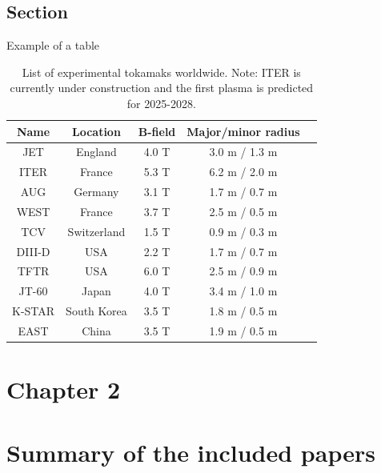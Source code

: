 \documentclass[electronic]{kthesis}
\begin{document}
	\section{Section}
	Example of a table
	\begin{table}[t!]
		\centering
		\caption{List of experimental tokamaks worldwide. Note: ITER is currently under construction and the first plasma is predicted for 2025-2028.}
		\begin{tabular}{ccccc}
			\hline
			\textbf{Name} & \textbf{Location} & \textbf{B-field} & \textbf{Major/minor radius}  \\
			\hline
			JET     & England      & 4.0 T & 3.0 m / 1.3 m \\
			ITER    & France       & 5.3 T & 6.2 m / 2.0 m \\
			AUG		& Germany      & 3.1 T & 1.7 m / 0.7 m \\
			WEST	& France	   & 3.7 T & 2.5 m / 0.5 m \\
			TCV     & Switzerland  & 1.5 T & 0.9 m / 0.3 m \\
			DIII-D  & USA          & 2.2 T & 1.7 m / 0.7 m \\
			TFTR 	& USA          & 6.0 T & 2.5 m / 0.9 m \\
			JT-60   & Japan        & 4.0 T & 3.4 m / 1.0 m \\
			K-STAR  & South Korea  & 3.5 T & 1.8 m / 0.5 m \\
			EAST    & China        & 3.5 T & 1.9 m / 0.5 m \\
			\hline
		\end{tabular}
		\label{TokamakTable}
	\end{table}
	
	
	\chapter{Chapter 2}
	\label{Ch2label}
	\noindent \lipsum[1]
	
	\chapter{Summary of the included papers}
	\label{Summary}
	\noindent \lipsum[1]
	
\end{document}

